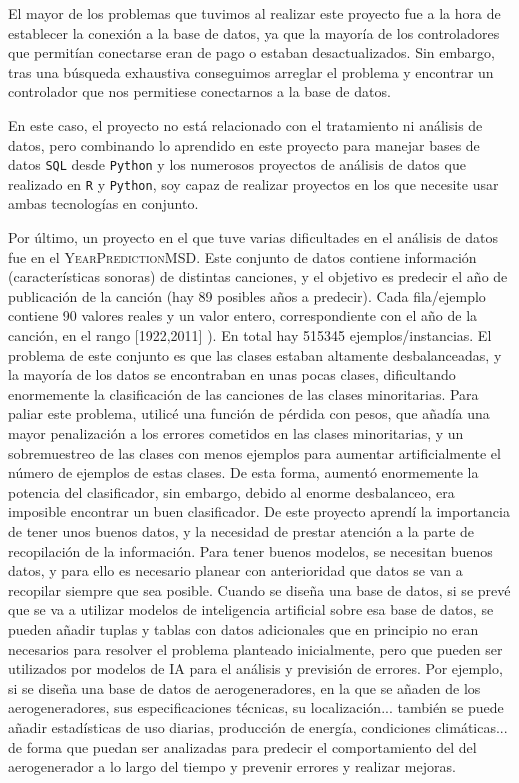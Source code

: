 \documentclass[12pt,a4paper]{article}
\begin{document}
	El mayor de los problemas que tuvimos al realizar este proyecto fue a la hora de establecer la conexión a la base de datos, ya que la mayoría de los controladores que permitían conectarse eran de pago o estaban desactualizados. Sin embargo, tras una búsqueda exhaustiva conseguimos arreglar el problema y encontrar un controlador que nos permitiese conectarnos a la base de datos.
	
	En este caso, el proyecto no está relacionado con el tratamiento ni análisis de datos, pero combinando lo aprendido en este proyecto para manejar bases de datos \texttt{SQL} desde \texttt{Python} y los numerosos proyectos de análisis de datos que realizado en \texttt{R} y \texttt{Python}, soy capaz de realizar proyectos en los que necesite usar ambas tecnologías en conjunto.
	
	Por último, un proyecto en el que tuve varias dificultades en el análisis de datos fue en el \textsc{YearPredictionMSD}. Este conjunto de datos contiene información (características sonoras) de distintas canciones, y el objetivo es predecir el año de publicación de la canción (hay 89 posibles años a predecir). Cada fila/ejemplo contiene 90 valores reales y un valor entero, correspondiente con el año de la canción, en el rango  [1922,2011] ). En total hay 515345 ejemplos/instancias.
El problema de este conjunto es que las clases estaban altamente desbalanceadas, y la mayoría de los datos se encontraban en unas pocas clases, dificultando enormemente la clasificación de las canciones de las clases minoritarias. Para paliar este problema, utilicé una función de pérdida con pesos, que añadía una mayor penalización a los errores cometidos en las clases minoritarias, y un sobremuestreo de las clases con menos ejemplos para aumentar artificialmente el número de ejemplos de estas clases. De esta forma, aumentó enormemente la potencia del clasificador, sin embargo, debido al enorme desbalanceo, era imposible encontrar un buen clasificador. De este proyecto aprendí la importancia de tener unos buenos datos, y la necesidad de prestar atención a la parte de recopilación de la información. Para tener buenos modelos, se necesitan buenos datos, y para ello es necesario planear con anterioridad que datos se van a recopilar siempre que sea posible. Cuando se diseña una base de datos, si se prevé que se va a utilizar modelos de inteligencia artificial sobre esa base de datos, se pueden añadir tuplas y tablas con datos adicionales que en principio no eran necesarios para resolver el problema planteado inicialmente, pero que pueden ser utilizados por modelos de IA para el análisis y previsión de errores. Por ejemplo, si se diseña una base de datos de aerogeneradores, en la que se añaden  de los aerogeneradores, sus especificaciones técnicas, su localización... también se puede añadir estadísticas de uso diarias, producción de energía, condiciones climáticas... de forma que puedan ser analizadas para predecir el comportamiento del del aerogenerador a lo largo del tiempo y prevenir errores y realizar mejoras.
\end{document}
